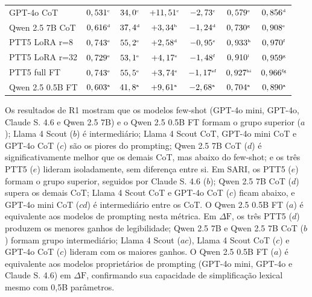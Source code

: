 \documentclass[a4paper, twocolumn, 11pt, twoside]{article}
\begin{document}
\begin{table}[htbp]
\begin{tabular}{l c c c c c c}
GPT-4o CoT           & $0,531^{\text{\tiny c}}$   & $34,0^{\text{\tiny c}}$   & $+11,51^{\text{\tiny c}}$  & $-2,73^{\text{\tiny c}}$  & $0,579^{\text{\tiny e}}$  & $0,856^{\text{\tiny d}}$ \\
Qwen 2.5 7B CoT      & $0,616^{\text{\tiny d}}$   & $37,4^{\text{\tiny d}}$   & $+3,34^{\text{\tiny b}}$   & $-1,24^{\text{\tiny d}}$  & $0,730^{\text{\tiny g}}$  & $0,908^{\text{\tiny e}}$ \\
PTT5 LoRA r=8        & $0,743^{\text{\tiny e}}$   & $55,2^{\text{\tiny e}}$   & $+2,58^{\text{\tiny d}}$   & $-0,95^{\text{\tiny e}}$  & $0,933^{\text{\tiny h}}$  & $0,970^{\text{\tiny f}}$ \\
PTT5 LoRA r=32       & $0,729^{\text{\tiny e}}$   & $53,1^{\text{\tiny e}}$   & $+4,17^{\text{\tiny e}}$   & $-1,48^{\text{\tiny f}}$  & $0,910^{\text{\tiny i}}$  & $0,959^{\text{\tiny g}}$ \\
PTT5 full FT         & $0,743^{\text{\tiny e}}$   & $55,5^{\text{\tiny e}}$   & $+3,74^{\text{\tiny e}}$   & $-1,17^{\text{\tiny ef}}$ & $0,927^{\text{\tiny hi}}$ & $0,966^{\text{\tiny fg}}$ \\
Qwen 2.5 0.5B FT     & $0,603^{\text{\tiny a}}$   & $41,8^{\text{\tiny a}}$   & $+9,61^{\text{\tiny a}}$   & $-2,68^{\text{\tiny a}}$  & $0,704^{\text{\tiny a}}$  & $0,890^{\text{\tiny a}}$ \\
\bottomrule
\end{tabular}
\end{table}

Os resultados de R1 mostram que os modelos few-shot (GPT-4o mini,
GPT-4o, Claude S. 4.6 e Qwen 2.5 7B) e o Qwen 2.5 0.5B FT formam o grupo
superior ($a$); Llama 4 Scout ($b$) é intermediário; Llama 4 Scout CoT,
GPT-4o mini CoT e GPT-4o CoT ($c$) são os piores do prompting;
Qwen 2.5 7B CoT ($d$) é significativamente melhor que os demais CoT,
mas abaixo do few-shot; e os três PTT5 ($e$) lideram isoladamente,
sem diferença entre si.
Em SARI, os PTT5 ($e$) formam o grupo superior, seguidos por
Claude S. 4.6 ($b$); Qwen 2.5 7B CoT ($d$) supera os demais CoT;
Llama 4 Scout CoT e GPT-4o CoT ($c$) ficam abaixo, e GPT-4o mini CoT ($cd$)
é intermediário entre os CoT. O Qwen 2.5 0.5B FT ($a$) é
equivalente aos modelos de prompting nesta métrica.
Em $\Delta \mathrm{F}$, os três PTT5 ($d$) produzem os menores ganhos de
legibilidade; Qwen 2.5 7B e Qwen 2.5 7B CoT ($b$) formam grupo
intermediário; Llama 4 Scout ($ac$), Llama 4 Scout CoT ($c$) e
GPT-4o CoT ($c$) lideram com os maiores ganhos.
O Qwen 2.5 0.5B FT ($a$) é equivalente aos modelos proprietários de
prompting (GPT-4o mini, GPT-4o e Claude S. 4.6) em $\Delta \mathrm{F}$,
confirmando sua capacidade de simplificação lexical mesmo com 0,5B
parâmetros.
\end{document}
